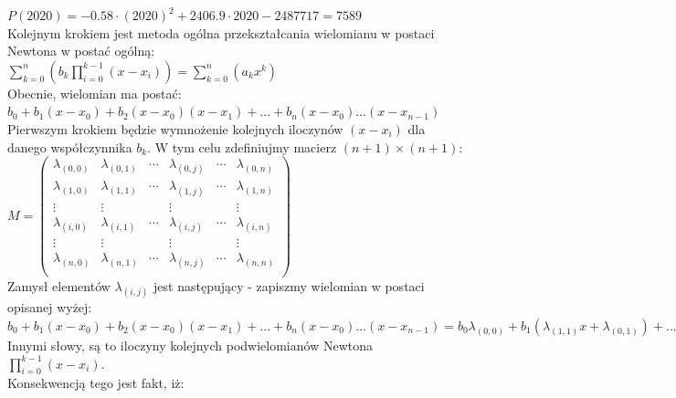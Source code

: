 \documentclass[a4paper,12pt]{article}
\newcommand{\id}{\noindent}
\newcommand{\el}[2]{\lambda_{(#1, #2)}}
\begin{document}
$P(2020) = -0.58\cdot (2020)^2 + 2406.9\cdot 2020 - 2487717 = 7589$ \\

\id
Kolejnym krokiem jest metoda ogólna przekształcania wielomianu w postaci Newtona w postać ogólną: \\

$\sum\limits_{k=0}^{n}\left( b_k\prod\limits_{i=0}^{k-1}(x-x_i) \right ) = \sum\limits_{k=0}^{n}\left(a_kx^k\right)$ \\

\id
Obecnie, wielomian ma postać: \\

$b_0 + b_1(x-x_0) + b_2(x-x_0)(x-x_1) + ... + b_n(x-x_0)...(x-x_{n-1})$ \\

\id
Pierwszym krokiem będzie wymnożenie kolejnych iloczynów $(x-x_i)$ dla danego współczynnika $b_k$. W tym celu zdefiniujmy macierz $(n+1)\times (n+1)$: \\

$M=\begin{pmatrix}
\lambda_{(0,0)} & \lambda_{(0,1)} & \cdots & \lambda_{(0,j)} & \cdots & \lambda_{(0,n)}\\ 
\lambda_{(1,0)} & \lambda_{(1,1)} & \cdots & \lambda_{(1,j)} & \cdots & \lambda_{(1,n)}\\ 
\vdots & \vdots & & \vdots & & \vdots\\ 
\lambda_{(i,0)} & \lambda_{(i,1)} & \cdots & \lambda_{(i,j)} & \cdots & \lambda_{(i,n)}\\ 
\vdots & \vdots &  & \vdots &  & \vdots\\ 
\lambda_{(n,0)} & \lambda_{(n,1)} & \cdots & \lambda_{(n,j)} & \cdots & \lambda_{(n,n)}\\ 
\end{pmatrix}$ \\

\id
Zamysł elementów $\el{i}{j}$ jest następujący - zapiszmy wielomian w postaci opisanej wyżej: \\

$b_0 + b_1(x-x_0) + b_2(x-x_0)(x-x_1) + ... + b_n(x-x_0)...(x-x_{n-1}) = b_0\el{0}{0} + b_1(\el{1}{1}x+\el{0}{1}) + ... + b_n(\el{n}{n}x^n + \el{n-1}{1}x^{n-1} + ... + \el{0}{n}x^0)$ \\

\id
Innymi słowy, są to iloczyny kolejnych podwielomianów Newtona $\prod\limits_{i=0}^{k-1}(x-x_i)$. \\

\id
Konsekwencją tego jest fakt, iż: \\
\end{document}
